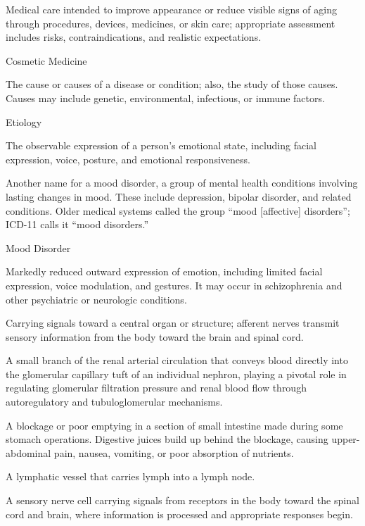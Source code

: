  Medical care intended to improve appearance or reduce visible signs of aging through procedures, devices, medicines, or skin care; appropriate assessment includes risks, contraindications, and realistic expectations.

\synonyms
Cosmetic Medicine

 The cause or causes of a disease or condition; also, the study of those causes. Causes may include genetic, environmental, infectious, or immune factors.

\synonyms
Etiology

 The observable expression of a person’s emotional state, including facial expression, voice, posture, and emotional responsiveness.

 Another name for a mood disorder, a group of
mental health conditions involving lasting changes in mood. These include
depression, bipolar disorder, and related conditions. Older medical systems
called the group “mood [affective] disorders”; ICD-11 calls it “mood disorders.”

\synonyms
Mood Disorder

 Markedly reduced outward expression of emotion, including limited facial expression, voice modulation, and gestures.
It may occur in schizophrenia and other psychiatric or neurologic conditions.

 Carrying signals toward a central organ or structure; afferent nerves transmit sensory information from the body toward the brain and spinal cord.

 A small branch of the renal arterial circulation that conveys blood directly into the glomerular capillary tuft of an individual nephron, playing a pivotal role in regulating glomerular filtration pressure and renal blood flow through autoregulatory and tubuloglomerular mechanisms.

 A blockage or poor emptying in a section of small intestine made during some stomach operations. Digestive juices build up behind the blockage, causing upper-abdominal pain, nausea, vomiting, or poor absorption of nutrients.

 A lymphatic vessel that carries lymph into a lymph node.

 A sensory nerve cell carrying signals from receptors in the body toward the spinal cord and brain, where information is processed and appropriate responses begin.

